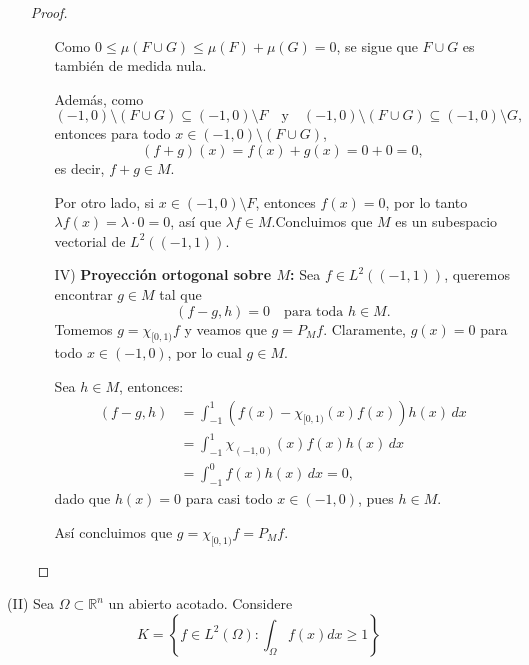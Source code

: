 \begin{itemize}
\begin{proof}
\begin{enumerate}
Como \( 0 \leq \mu(F \cup G) \leq \mu(F) + \mu(G) = 0 \), se sigue que \( F \cup G \) es también de medida nula.

Además, como
\[
(-1,0) \setminus (F \cup G) \subseteq (-1,0) \setminus F \quad \text{y} \quad (-1,0) \setminus (F \cup G) \subseteq (-1,0) \setminus G,
\]
entonces para todo \( x \in (-1,0) \setminus (F \cup G) \),
\[
(f + g)(x) = f(x) + g(x) = 0 + 0 = 0,
\]
es decir, \( f + g \in M \).

Por otro lado, si \( x \in (-1,0) \setminus F \), entonces \( f(x) = 0 \), por lo tanto \( \lambda f(x) = \lambda \cdot 0 = 0 \), así que \( \lambda f \in M \).Concluimos que \( M \) es un subespacio vectorial de \( L^2((-1,1)) \).
\item[IV)] \textbf{Proyección ortogonal sobre \( M \):} Sea \( f \in L^2((-1,1)) \), queremos encontrar \( g \in M \) tal que 
\[
(f - g, h) = 0 \quad \text{para toda } h \in M.
\]
Tomemos \( g = \chi_{[0,1)} f \) y veamos que \( g = P_M f \). Claramente, \( g(x) = 0 \) para todo \( x \in (-1,0) \), por lo cual \( g \in M \).

Sea \( h \in M \), entonces:
\begin{align*}
(f - g, h) &= \int_{-1}^1 \left(f(x) - \chi_{[0,1)}(x) f(x)\right) h(x) \, dx \\
&= \int_{-1}^1 \chi_{(-1,0)}(x) f(x) h(x) \, dx \\
&= \int_{-1}^0 f(x) h(x) \, dx = 0,
\end{align*}
dado que \( h(x) = 0 \) para casi todo \( x \in (-1,0) \), pues \( h \in M \).

Así concluimos que \( g = \chi_{[0,1)} f = P_M f \).



        \end{enumerate}
    \end{proof}
 \end{itemize}
(II) Sea $\Omega \subset \mathbb{R}^n$ un abierto acotado. Considere
$$
K=\left\{f \in L^2(\Omega): \int_{\Omega} f(x) d x \geq 1\right\}
$$
